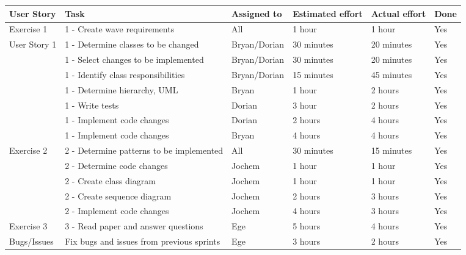 \documentclass[10pt]{article}
\begin{document}
\begin{center}

    \hspace*{-3cm}\begin{tabular}{ | p{2cm} | p{9cm} | p{2cm} | p{1.8cm} | p{1.8cm} | p{1cm} |}
    \hline
    User Story & Task & Assigned to & Estimated effort & Actual effort & Done \\ \hline
    Exercise 1 & 1 - Create wave requirements & All & 1 hour & 1 hour & Yes\\ 
    User Story 1 & 1 - Determine classes to be changed & Bryan/Dorian & 30 minutes & 20 minutes & Yes\\ 
    & 1 - Select changes to be implemented & Bryan/Dorian & 30 minutes & 20 minutes & Yes\\ 
    & 1 - Identify class responsibilities & Bryan/Dorian & 15 minutes & 45 minutes & Yes\\ 
    & 1 - Determine hierarchy, UML & Bryan & 1 hour & 2 hours & Yes\\ 
    & 1 - Write tests & Dorian & 3 hour & 2 hours & Yes\\
    & 1 - Implement code changes & Dorian & 2 hours & 4 hours & Yes\\ 
    & 1 - Implement code changes & Bryan & 4 hours & 4 hours & Yes\\ \hline
    Exercise 2 & 2 - Determine patterns to be implemented & All & 30 minutes & 15 minutes & Yes\\ 
    & 2 - Determine code changes & Jochem & 1 hour & 1 hour & Yes\\
    & 2 - Create class diagram & Jochem & 1 hour & 1 hour & Yes\\ 
    & 2 - Create sequence diagram & Jochem & 2 hours & 3 hours & Yes\\ 
    & 2 - Implement code changes & Jochem & 4 hours & 3 hours & Yes\\ \hline
    Exercise 3 & 3 - Read paper and answer questions & Ege & 5 hours & 4 hours & Yes\\ \hline
    Bugs/Issues & Fix bugs and issues from previous sprints & Ege & 3 hours & 2 hours & Yes\\ \hline
    \end{tabular}
        
        \vspace{10mm}
        

\end{center}
\end{document}
